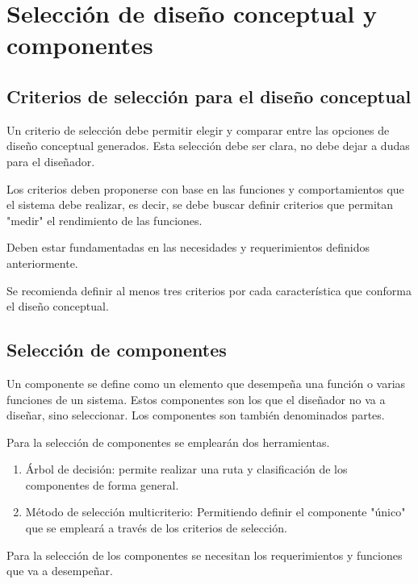 \section{Selección de diseño conceptual y componentes}

\subsection{Criterios de selección para el diseño conceptual}

Un criterio de selección debe permitir elegir y comparar entre las opciones de diseño conceptual generados. Esta selección debe ser clara, no debe dejar a dudas para el diseñador. 

Los criterios deben proponerse con base en las funciones y comportamientos que el sistema debe realizar, es decir, se debe buscar definir criterios que permitan "medir" el rendimiento de las funciones. 

Deben estar fundamentadas en las necesidades y requerimientos definidos anteriormente. 

Se recomienda definir al menos tres criterios por cada característica que conforma el diseño conceptual. 

\subsection{Selección de componentes}

Un componente se define como un elemento que desempeña una función o varias funciones de un sistema. Estos componentes son los que el diseñador no va a diseñar, sino seleccionar. Los componentes son también denominados partes. 

Para la selección de componentes se emplearán dos herramientas.

\begin{enumerate}
    \item Árbol de decisión: permite realizar una ruta y clasificación de los componentes de forma general.
    
    \item Método de selección multicriterio: Permitiendo definir el componente "único" que se empleará a través de los criterios de selección.
\end{enumerate}

Para la selección de los componentes se necesitan los requerimientos y funciones que va a desempeñar.

